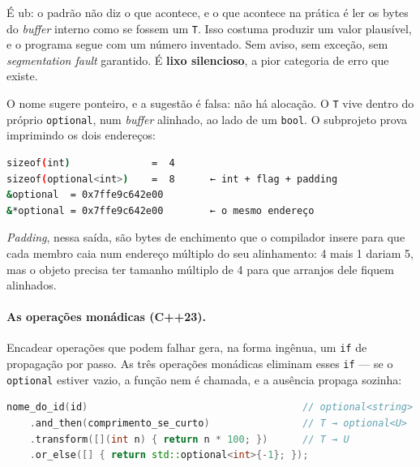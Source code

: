 \begin{armadilha}
É \gls{ub}: o padrão não diz o que acontece, e o que acontece na prática é ler
os bytes do \emph{buffer} interno como se fossem um \texttt{T}. Isso costuma
produzir um valor plausível, e o programa segue com um número inventado. Sem
aviso, sem exceção, sem \emph{segmentation fault} garantido. É \textbf{lixo
silencioso}, a pior categoria de erro que existe.
\end{armadilha}

O nome sugere ponteiro, e a sugestão é falsa: não há alocação. O \texttt{T} vive
dentro do próprio \texttt{optional}, num \emph{buffer} alinhado, ao lado de um
\texttt{bool}. O subprojeto prova imprimindo os dois endereços:

\begin{lstlisting}[style=bt, language=bash,
    caption={Saída de \texttt{src/vocabulary\_types/}: o \texttt{T} vive dentro
             do \texttt{optional}.}]
sizeof(int)              =  4
sizeof(optional<int>)    =  8      ← int + flag + padding
&optional  = 0x7ffe9c642e00
&*optional = 0x7ffe9c642e00        ← o mesmo endereço
\end{lstlisting}

\emph{Padding}, nessa saída, são bytes de enchimento que o compilador insere
para que cada membro caia num endereço múltiplo do seu alinhamento: 4 mais 1
dariam 5, mas o objeto precisa ter tamanho múltiplo de 4 para que arranjos dele
fiquem alinhados.

\paragraph{As operações monádicas (C++23).} Encadear operações que podem falhar
gera, na forma ingênua, um \texttt{if} de propagação por passo. As três
operações monádicas eliminam esses \texttt{if} --- se o \texttt{optional}
estiver vazio, a função nem é chamada, e a ausência propaga sozinha:

\begin{lstlisting}[style=bt, language=C++,
    caption={O encadeamento monádico, em
             \texttt{src/vocabulary\_types/demo\_optional.hpp}.}]
nome_do_id(id)                                     // optional<string>
    .and_then(comprimento_se_curto)                // T → optional<U>
    .transform([](int n) { return n * 100; })      // T → U
    .or_else([] { return std::optional<int>{-1}; });
\end{lstlisting}

